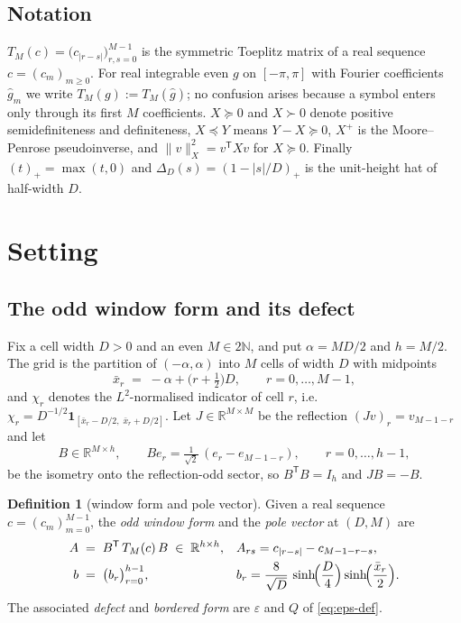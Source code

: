 \documentclass[11pt,a4paper]{article}
\theoremstyle{plain}
\theoremstyle{definition}
\newtheorem{definition}[theorem]{Definition}
\newcommand{\R}{\mathbb{R}}
\newcommand{\N}{\mathbb{N}}
\newcommand{\T}{\mathsf{T}}
\newcommand{\Tm}[1]{T_{#1}}
\newcommand{\PSD}{\succeq 0}
\newcommand{\PD}{\succ 0}
\begin{document}
\subsection{Notation}

$\Tm{M}(c)=\bigl(c_{|r-s|}\bigr)_{r,s=0}^{M-1}$ is the symmetric Toeplitz matrix of a
real sequence $c=(c_{m})_{m\ge0}$. For real integrable even $g$ on $[-\pi,\pi]$ with
Fourier coefficients $\widehat g_{m}$ we write $\Tm{M}(g):=\Tm{M}(\widehat g)$;
no confusion arises because a symbol enters only through its first $M$ coefficients.
$X\PSD$ and $X\PD$ denote positive semidefiniteness and definiteness, $X\preceq Y$
means $Y-X\PSD$, $X^{+}$ is the Moore--Penrose pseudoinverse, and
$\|v\|_{X}^{2}=v^{\T}Xv$ for $X\PSD$. Finally
$(t)_{+}=\max(t,0)$ and $\Delta_{D}(s)=(1-|s|/D)_{+}$ is the unit-height hat of
half-width $D$.

\section{Setting}
\label{sec:setting}

\subsection{The odd window form and its defect}

Fix a cell width $D>0$ and an even $M\in2\N$, and put $\alpha=MD/2$ and $h=M/2$.
The grid is the partition of $(-\alpha,\alpha)$ into $M$ cells of width $D$ with
midpoints
\begin{equation}
\label{eq:cells}
  \bar x_{r} \;=\; -\alpha+\bigl(r+\tfrac12\bigr)D, \qquad r=0,\dots,M-1 ,
\end{equation}
and $\chi_{r}$ denotes the $L^{2}$-normalised indicator of cell $r$, i.e.\
$\chi_{r}=D^{-1/2}\mathbf 1_{[\bar x_{r}-D/2,\;\bar x_{r}+D/2]}$. Let
$J\in\R^{M\times M}$ be the reflection $(Jv)_{r}=v_{M-1-r}$ and let
\begin{equation}
\label{eq:B}
  B\in\R^{M\times h},\qquad Be_{r}=\tfrac{1}{\sqrt2}\,(e_{r}-e_{M-1-r}),
  \qquad r=0,\dots,h-1,
\end{equation}
be the isometry onto the reflection-odd sector, so $B^{\T}B=I_{h}$ and
$JB=-B$.

\begin{definition}[window form and pole vector]
\label{def:window}
Given a real sequence $c=(c_{m})_{m=0}^{M-1}$, the \emph{odd window form} and the
\emph{pole vector} at $(D,M)$ are
\begin{align}
\label{eq:Adef}
  A &\;=\; B^{\T}\,\Tm{M}(c)\,B \;\in\;\R^{h\times h},
  &&A_{rs}=c_{|r-s|}-c_{M-1-r-s},\\
\label{eq:bdef}
  b &\;=\; \bigl(b_{r}\bigr)_{r=0}^{h-1},
  &&b_{r}=\frac{8}{\sqrt D}\,\sinh\!\Bigl(\frac D4\Bigr)\sinh\!\Bigl(\frac{\bar x_{r}}{2}\Bigr).
\end{align}
The associated \emph{defect} and \emph{bordered form} are $\varepsilon$ and $Q$ of
\eqref{eq:eps-def}.
\end{definition}
\end{document}
